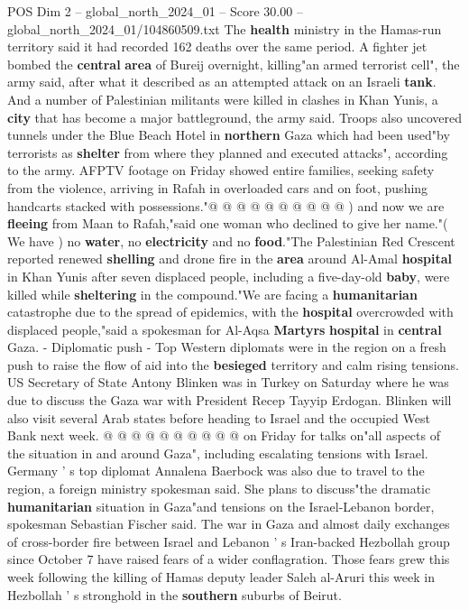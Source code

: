 \begin{textsample}{POS Dim 2 – global\_north\_2024\_01 – Score 30.00 – global\_north\_2024\_01/104860509.txt}
The \textbf{health} ministry in the Hamas-run territory said it had recorded 162 deaths over the same period.
A fighter jet bombed the \textbf{central} \textbf{area} of Bureij overnight, killing"an armed terrorist cell", the army said, after what it described as an attempted attack on an Israeli \textbf{tank}.
And a number of Palestinian militants were killed in clashes in Khan Yunis, a \textbf{city} that has become a major battleground, the army said.
Troops also uncovered tunnels under the Blue Beach Hotel in \textbf{northern} Gaza which had been used"by terrorists as \textbf{shelter} from where they planned and executed attacks", according to the army.
AFPTV footage on Friday showed entire families, seeking safety from the violence, arriving in Rafah in overloaded cars and on foot, pushing handcarts stacked with possessions."@ @ @ @ @ @ @ @ @ @ ) and now we are \textbf{fleeing} from Maan to Rafah,"said one woman who declined to give her name."( We have ) no \textbf{water}, no \textbf{electricity} and no \textbf{food}."The Palestinian Red Crescent reported renewed \textbf{shelling} and drone fire in the \textbf{area} around Al-Amal \textbf{hospital} in Khan Yunis after seven displaced people, including a five-day-old \textbf{baby}, were killed while \textbf{sheltering} in the compound."We are facing a \textbf{humanitarian} catastrophe due to the spread of epidemics, with the \textbf{hospital} overcrowded with displaced people,"said a spokesman for Al-Aqsa \textbf{Martyrs} \textbf{hospital} in \textbf{central} Gaza. - Diplomatic push - Top Western diplomats were in the region on a fresh push to raise the flow of aid into the \textbf{besieged} territory and calm rising tensions.
US Secretary of State Antony Blinken was in Turkey on Saturday where he was due to discuss the Gaza war with President Recep Tayyip Erdogan.
Blinken will also visit several Arab states before heading to Israel and the occupied West Bank next week. @ @ @ @ @ @ @ @ @ @ on Friday for talks on"all aspects of the situation in and around Gaza", including escalating tensions with Israel.
Germany ' s top diplomat Annalena Baerbock was also due to travel to the region, a foreign ministry spokesman said.
She plans to discuss"the dramatic \textbf{humanitarian} situation in Gaza"and tensions on the Israel-Lebanon border, spokesman Sebastian Fischer said.
The war in Gaza and almost daily exchanges of cross-border fire between Israel and Lebanon ' s Iran-backed Hezbollah group since October 7 have raised fears of a wider conflagration.
Those fears grew this week following the killing of Hamas deputy leader Saleh al-Aruri this week in Hezbollah ' s stronghold in the \textbf{southern} suburbs of Beirut.

\end{textsample}
